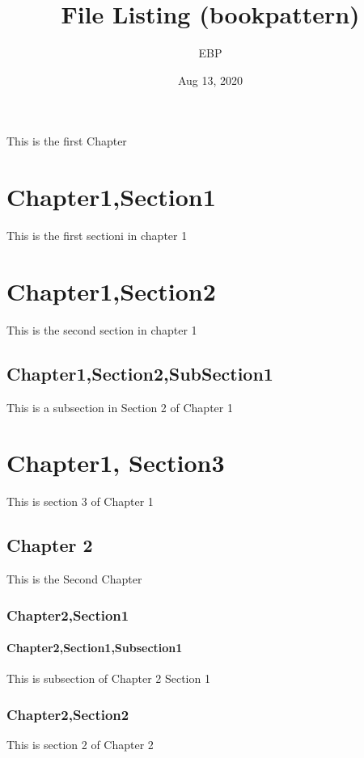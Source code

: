 \documentclass[letterpaper,10pt,english]{sphinxmanual}
\title{File Listing (bookpattern)}
\date{Aug 13, 2020}
\author{EBP}
\begin{document}
\pagestyle{empty}
\sphinxmaketitle
\pagestyle{plain}
\sphinxtableofcontents
\pagestyle{normal}
\label{\detokenize{chapter1::doc}}


This is the first Chapter


\chapter{Chapter1,Section1}
\label{\detokenize{chapter1:chapter1-section1}}
This is the first sectioni in chapter 1


\chapter{Chapter1,Section2}
\label{\detokenize{chapter1:chapter1-section2}}
This is the second section in chapter 1


\section{Chapter1,Section2,SubSection1}
\label{\detokenize{chapter1:chapter1-section2-subsection1}}
This is a subsection in Section 2 of Chapter 1


\chapter{Chapter1, Section3}
\label{\detokenize{chapter1:chapter1-section3}}
This is section 3 of Chapter 1


\section{Chapter 2}
\label{\detokenize{chapter2:chapter-2}}\label{\detokenize{chapter2::doc}}
This is the Second Chapter


\subsection{Chapter2,Section1}
\label{\detokenize{chapter2:chapter2-section1}}

\subsubsection{Chapter2,Section1,Subsection1}
\label{\detokenize{chapter2:chapter2-section1-subsection1}}
This is subsection of Chapter 2 Section 1


\subsection{Chapter2,Section2}
\label{\detokenize{chapter2:chapter2-section2}}
This is section 2 of Chapter 2
\end{document}
